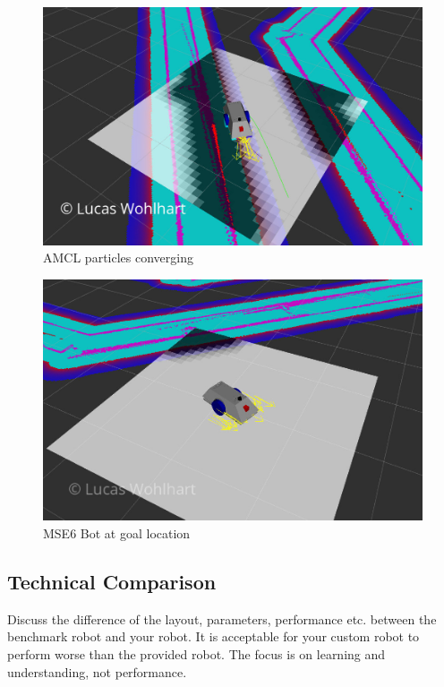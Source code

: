 \documentclass[10pt,journal,compsoc]{IEEEtran}
\begin{document}
\begin{figure}[thpb]
      \centering
      \includegraphics[width=\linewidth]{img/lw_mse6_bot_particles_converged}
      \caption{AMCL particles converging}
      \label{fig:amcl_particles_converging}
\end{figure}
\begin{figure}[thpb]
      \centering
      \includegraphics[width=\linewidth]{img/lw_mse6_bot_goal_location}
      \caption{MSE6 Bot at goal location}
      \label{fig:mse6_bot_goal_location}
\end{figure}

\subsection{Technical Comparison} %
Discuss the difference of the layout, parameters, performance etc. between the benchmark robot and your robot. It is acceptable for your custom robot to perform worse than the provided robot. The focus is on learning and understanding, not performance. 
\end{document}
